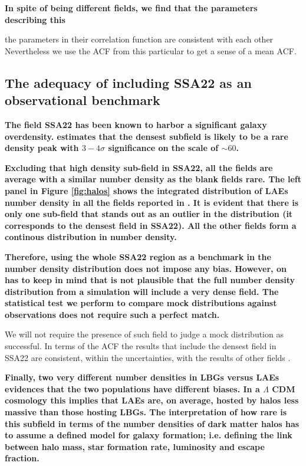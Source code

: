 \documentclass[usenatbib]{mn2e}
\newcommand{\ly}{{\ifmmode{{\rm Ly}\alpha}\else{Ly$\alpha$~}\fi}}
\newcommand{\hMpc}{{\ifmmode{h^{-1}{\rm Mpc}}\else{$h^{-1}$Mpc }\fi}}
\begin{document}
{\bf In spite of being different fields, we find that the parameters
  describing this 

the parameters in their
  correlation function are consistent with each other Nevertheless we use the ACF from this
  particular to  get a sense of a mean ACF.


\subsection{The adequacy of including SSA22 as an observational benchmark}

{\bf The field SSA22 has been known to harbor a significant
  galaxy overdensity. \cite{Yamada2012} estimates that the densest
  subfield is likely to be a rare density peak with $3-4\sigma$
  significance on the scale of $\sim 60$\hMpc.}

{\bf Excluding that high density sub-field in SSA22, all the fields
  are average with a similar number density as the blank fields
  rare. The left panel in Figure \ref{fig:halos} shows the integrated distribution of LAEs number density in all the fields reported in
  \cite{Yamada2012}. It is evident that there is only one sub-field that
  stands out as an outlier in the distribution (it corresponds to the
  densest field in SSA22). All the other fields form a continous
  distribution in number density.}  


{\bf Therefore, using the whole SSA22 region as a benchmark in the
  number density distribution does not impose any bias. However, on
  has to  keep in mind that is not plausible that the full number
  density distribution from a simulation will include a very dense
  field. The statistical test we perform to compare mock distributions against
  observations does not require such a perfect match. 
  
We will not
  require the presence of such field to judge a mock distribution as
  successful. In terms of the ACF the results that include the densest
  field in SSA22 \citep{Hayashino2004} are consistent, within the
  uncertainties, with the results of other fields \citep{Ouchi2008}.} 

{\bf Finally, two very different number densities in LBGs versus LAEs evidences
  that the two populations have different biases. In a $\Lambda$ CDM
  cosmology this implies that LAEs are, on average, hosted by halos
  less massive than those hosting LBGs. The interpretation of how rare
  is this subfield in terms of the number densities of dark matter
  halos has to assume a defined model for galaxy formation;
  i.e. defining the link between halo mass, star formation rate, \ly
  luminosity and \ly escape fraction.} 

}
\end{document}
